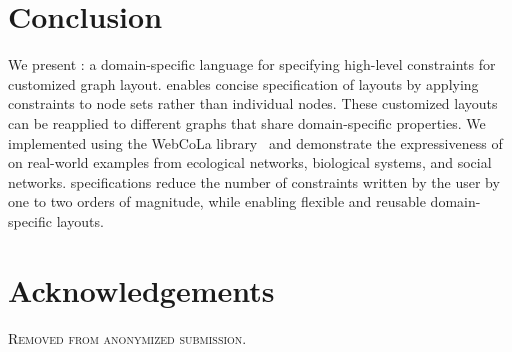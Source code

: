 \section{Conclusion}
We present \projectname: a domain-specific language for specifying high-level
constraints for customized graph layout. \projectname enables concise 
specification of layouts by applying constraints to node sets
rather than individual nodes. These customized layouts can
be reapplied to different graphs that share domain-specific properties.
We implemented \projectname using the WebCoLa library~\cite{WebCoLa} and demonstrate the expressiveness
of \projectname on real-world examples from ecological networks,
biological systems, and social networks. \projectname specifications reduce the
number of constraints written by the user by one to two orders of magnitude,
while enabling flexible and reusable domain-specific layouts.

\section*{Acknowledgements}
\textsc{Removed from anonymized submission.}
